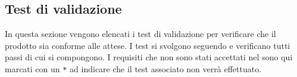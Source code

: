 	\subsection{Test di validazione}
	In questa sezione vengono elencati i test di validazione per verificare che il prodotto sia conforme alle attese. I test si svolgono seguendo e verificano tutti passi di cui si compongono. I requisiti che non sono stati accettati nel \AnalisiDeiRequisiti{} sono qui marcati con un \texttt{*} ad indicare che il test associato non verrà effettuato.
	
	
	
	
	
	

